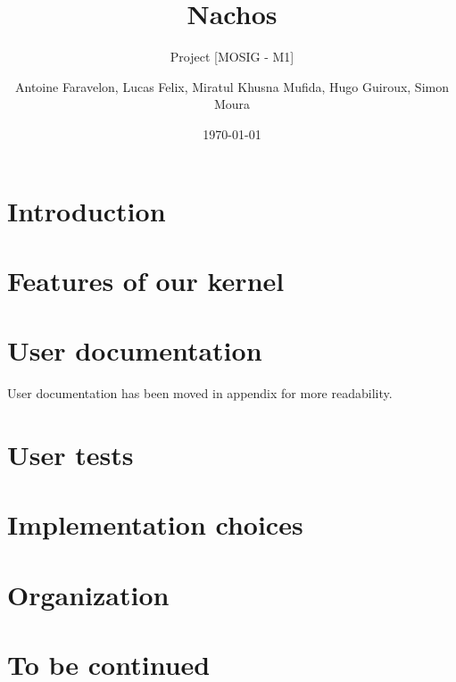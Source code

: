 \documentclass[a4paper,10pt]{article}
\title{Nachos}
\subtitle{Project [MOSIG - M1]}
\author{Antoine Faravelon, Lucas Felix, Miratul Khusna Mufida, Hugo Guiroux, Simon Moura}
\date{\today}
\begin{document}
\begin{titlepage}
  \maketitle
\thispagestyle{empty}
\tableofcontents
\end{titlepage}


\pagestyle{plain}
\setcounter{page}{1}
\section{Introduction}
    
\section{Features of our kernel}
    

\section{User documentation}
User documentation has been moved in appendix for more readability.

\section{User tests}
    
\section{Implementation choices}
    

\section{Organization}
    

\section{To be continued}
    

\appendix
    
\end{document}
